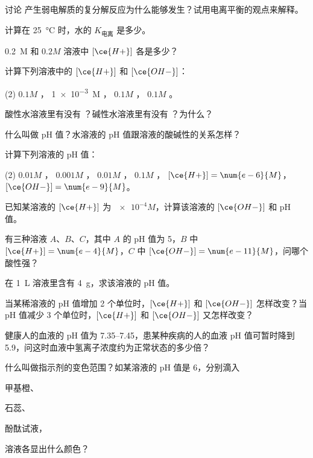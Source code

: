 \begin{Theorem}{讨论}
  产生弱电解质的复分解反应为什么能够发生？试用电离平衡的观点来解释。
\end{Theorem}

\begin{Practice}[习题]
\begin{question}
  \item 计算在 \qty{25}{\celsius} 时，水的 $K_\text{电离}$ 是多少。
  \item \qty{0.2}{M}  和 $0.2M$  溶液中 $[\ce{H+}]$ 各是多少？
  \item 计算下列溶液中的 $[\ce{H+}]$ 和 $[\ce{OH-}]$：
  \begin{tasks}(2)
    \task $0.1M$ ，
    \task \qty{1e-3}{M} ，
    \task $0.1M$ ，
    \task $0.1M$ 。
  \end{tasks}
  \item 酸性水溶液里有没有 ？碱性水溶液里有没有 ？为什么？
  \item 什么叫做 pH 值？水溶液的 pH 值跟溶液的酸碱性的关系怎样？
  \item 计算下列溶液的 pH 值：
  \begin{tasks}(2)
    \task $0.01M$ ，
    \task $0.001M$ ，
    \task $0.01M$ ，
    \task $0.1M$ ，
    \task $[\ce{H+}]=\num{e-6}{M}$，
    \task $[\ce{OH-}]=\num{e-9}{M}$。
  \end{tasks}
  \item 已知某溶液的 $[\ce{H+}]$ 为 $\num{e-4}{M}$，计算该溶液的 $[\ce{OH-}]$ 和 pH 值。
  \item 有三种溶液 $A$、$B$、$C$，其中 $A$ 的 pH 值为 5，$B$ 中 $[\ce{H+}]=\num{e-4}{M}$，$C$ 中 $[\ce{OH-}]=\num{e-11}{M}$，问哪个酸性强？
  \item 在 \qty{1}{L} 溶液里含有  \qty{4}{g}，求该溶液的 pH 值。
  \item 当某稀溶液的 pH 值增加 2 个单位时，$[\ce{H+}]$ 和 $[\ce{OH-}]$ 怎样改变？当 pH 值减少 3 个单位时，$[\ce{H+}]$ 和 $[\ce{OH-}]$ 又怎样改变？
  \item 健康人的血液的 pH 值为 \numrange{7.35}{7.45}，患某种疾病的人的血液 pH 值可暂时降到 5.9，问这时血液中氢离子浓度约为正常状态的多少倍？
  \item 什么叫做指示剂的变色范围？如某溶液的 pH 值是 6，分别滴入
  \begin{enumerate*} 
    \item 甲基橙、
    \item 石蕊、
    \item 酚酞试液，
  \end{enumerate*}溶液各显出什么颜色？
\end{question}
\end{Practice}

